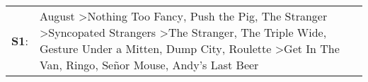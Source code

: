 \begin{supertabular}{p{0.03\textwidth}p{0.92\textwidth}}
 \textbf{S1}:  &  August\textsuperscript{} \textgreater \enspace Nothing Too Fancy\textsuperscript{}, \enspace Push the Pig\textsuperscript{}, \enspace The Stranger\textsuperscript{} \textgreater \enspace Syncopated Strangers\textsuperscript{} \textgreater \enspace The Stranger\textsuperscript{}, \enspace The Triple Wide\textsuperscript{}, \enspace Gesture Under a Mitten\textsuperscript{}, \enspace Dump City\textsuperscript{}, \enspace Roulette\textsuperscript{} \textgreater \enspace Get In The Van\textsuperscript{}, \enspace Ringo\textsuperscript{}, \enspace Señor Mouse\textsuperscript{}, \enspace Andy's Last Beer\textsuperscript{}  \enspace  \\
\end{supertabular}
